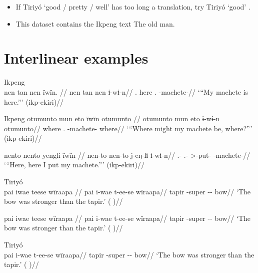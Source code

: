 \documentclass{article}
\begin{document}
\begin{itemize}
\item
  If Tiriyó  `good / pretty / well'
  \parencites[345]{triomeira1999} has too long a translation, try Tiriyó
   `good' \parencites[345]{triomeira1999}.
\item
  This dataset contains the Ikpeng text The old man.
\end{itemize}

\section{\texorpdfstring{Interlinear
examples\label{interlinear-examples}}{Interlinear examples}}

\ex  Ikpeng  \\\label{ekiri-13}
\begingl \glpreamble nen tan nen ïwïn. //
\gla nen tan nen ɨ-wɨ-n//
\glb {}. here . -machete-//
\glft ‘“My machete is here.”’ (ikp-ekiri)//
\endgl
\xe

\pex Ikpeng\label{machete}    
\a \label{ekiri-9}
\begingl \glpreamble otumunto mun eto ïwïn otumunto //
\gla otumunto mun eto ɨ-wɨ-n otumunto//
\glb where .  -machete- where//
\glft ‘“Where might my machete be, where?”’ (ikp-ekiri)//
\endgl

    
\a \label{ekiri-10}
\begingl \glpreamble nento nento yengli ïwïn //
\gla nen-to nen-to j-eŋ-lɨ ɨ-wɨ-n//
\glb {}.- .- >-put- -machete-//
\glft ‘“Here, here I put my machete.”’ (ikp-ekiri)//
\endgl

\xe

\ex  Tiriyó  \\\label{tri-1}
\begingl \glpreamble pai iwae teese wïraapa //
\gla pai i-wae t-ee-se wïraapa//
\glb tapir -super -- bow//
\glft ‘The bow was stronger than the tapir.’ (\cite[420]{triomeira1999}
)//
\endgl
\xe

\ex \label{tri-1}
\begingl \glpreamble pai iwae teese wïraapa //
\gla pai i-wae t-ee-se wïraapa//
\glb tapir -super -- bow//
\glft ‘The bow was stronger than the tapir.’ (\cite[420]{triomeira1999}
)//
\endgl
\xe

\ex  Tiriyó  \\\label{tri-1}
\begingl 
\gla pai i-wae t-ee-se wïraapa//
\glb tapir -super -- bow//
\glft ‘The bow was stronger than the tapir.’ (\cite[420]{triomeira1999}
)//
\endgl
\xe
\end{document}
